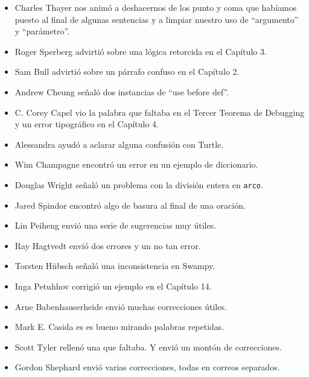 \documentclass[10pt]{book}
\begin{document}
\begin{itemize}
\item Charles Thayer nos animó a deshacernos de los punto y coma que
habíamos puesto al final de algunas sentencias y a limpiar nuestro
uso de ``argumento'' y ``parámetro''.

\item Roger Sperberg advirtió sobre una lógica retorcida en el Capítulo 3.

\item Sam Bull advirtió sobre un párrafo confuso en el Capítulo 2.

\item Andrew Cheung señaló dos instancias de ``use before def''.

\item C. Corey Capel vio la palabra que faltaba en el Tercer Teorema
de Debugging y un error tipográfico en el Capítulo 4.

\item Alessandra ayudó a aclarar alguna confusión con Turtle.

\item Wim Champagne encontró un error en un ejemplo de diccionario.

\item Douglas Wright señaló un problema con la división entera en
{\tt arco}.

\item Jared Spindor encontró algo de basura al final de una oración.

\item Lin Peiheng envió una serie de sugerencias muy útiles.

\item Ray Hagtvedt envió dos errores y un no tan error.

\item Torsten H\"{u}bsch señaló una inconsistencia en Swampy.

\item Inga Petuhhov corrigió un ejemplo en el Capítulo 14.

\item Arne Babenhauserheide envió muchas correcciones útiles.

\item Mark E. Casida es es bueno mirando palabras repetidas.

\item Scott Tyler rellenó una que faltaba.  Y envió
un montón de correcciones.

\item Gordon Shephard envió varias correcciones, todas en correos
separados.


\end{itemize}
\end{document}
